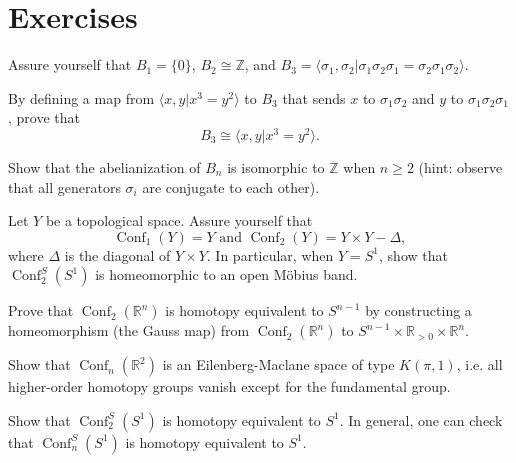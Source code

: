 \documentclass{article}
\DeclareMathOperator{\Conf}{Conf}
\begin{document}
\section{Exercises}

\begin{exercise}
Assure yourself that $B_{1} = \{0\}$, $B_{2} \cong \mathbb{Z}$, and $B_{3} = \langle \sigma_{1}, \sigma_{2}| \sigma_{1} \sigma_{2} \sigma_{1} = \sigma_{2} \sigma_{1} \sigma_{2} \rangle$. 
\end{exercise}

\begin{exercise}
By defining a map from $\langle x, y |x^{3} = y^{2} \rangle$ to $B_{3}$ that sends $x$ to $\sigma_{1} \sigma_{2}$ and $y$ to $\sigma_{1} \sigma_{2} \sigma_{1}$, prove that 
\[B_{3} \cong \langle x, y |x^{3} = y^{2} \rangle.\]
\end{exercise}

\begin{exercise}
Show that the abelianization of $B_{n}$ is isomorphic to $\mathbb{Z}$ when $n \geq 2$ (hint: observe that all generators $\sigma_{i}$ are conjugate to each other).  
\end{exercise}

\begin{exercise}
Let $Y$ be a topological space. Assure yourself that 
\[
\Conf_{1}(Y) = Y \text{ and } \Conf_{2}(Y) = Y \times Y - \Delta, 
\]
where $\Delta$ is the diagonal of $Y \times Y$. In particular, when $Y = S^{1}$, show that 
$\Conf_{2}^{S}(S^{1})$ is homeomorphic to an open M\"{o}bius band.  
\end{exercise}

\begin{exercise}
Prove that $\Conf_{2}(\mathbb{R}^{n})$ is homotopy equivalent to $S^{n - 1}$ by constructing a homeomorphism (the Gauss map) from $\Conf_{2}(\mathbb{R}^{n})$ to $S^{n - 1} \times \mathbb{R}_{>0} \times \mathbb{R}^{n}$. 
\end{exercise}

\begin{exercise}
Show that $\Conf_{n}(\mathbb{R}^{2})$ is an Eilenberg-Maclane space of type $K(\pi, 1)$, i.e. all higher-order homotopy groups vanish except for the fundamental group.  
\end{exercise}

\begin{exercise}
Show that $\Conf_{2}^{S}(S^{1})$ is homotopy equivalent to $S^{1}$. In general, one can check that $\Conf_{n}^{S}(S^{1})$ is homotopy equivalent to $S^{1}$.    
\end{exercise}
\end{document}
